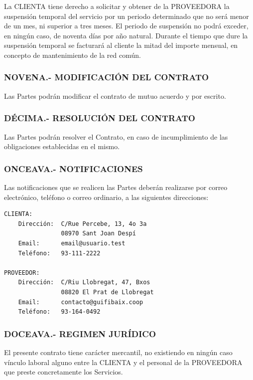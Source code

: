 \documentclass[11pt,spanish,a4paper,]{article}
\begin{document}
La CLIENTA tiene derecho a solicitar y obtener de la PROVEEDORA la
suspensión temporal del servicio por un periodo determinado que no será
menor de un mes, ni superior a tres meses. El periodo de suspensión no
podrá exceder, en ningún caso, de noventa días por año natural. Durante
el tiempo que dure la suspensión temporal se facturará al cliente la
mitad del importe mensual, en concepto de mantenimiento de la red común.

\subsubsection{NOVENA.- MODIFICACIÓN DEL
CONTRATO}\label{novena.--modificaciuxf3n-del-contrato}

Las Partes podrán modificar el contrato de mutuo acuerdo y por escrito.

\subsubsection{DÉCIMA.- RESOLUCIÓN DEL
CONTRATO}\label{duxe9cima.--resoluciuxf3n-del-contrato}

Las Partes podrán resolver el Contrato, en caso de incumplimiento de las
obligaciones establecidas en el mismo.

\subsubsection{ONCEAVA.- NOTIFICACIONES}\label{onceava.--notificaciones}

Las notificaciones que se realicen las Partes deberán realizarse por
correo electrónico, teléfono o correo ordinario, a las siguientes
direcciones:

\begin{verbatim}
CLIENTA:
    Dirección:  C/Rue Percebe, 13, 4o 3a
                08970 Sant Joan Despí
    Email:      email@usuario.test
    Teléfono:   93-111-2222

PROVEEDOR:
    Dirección:  C/Riu Llobregat, 47, Bxos
                08820 El Prat de Llobregat
    Email:      contacto@guifibaix.coop
    Teléfono:   93-164-0492
\end{verbatim}

\subsubsection{DOCEAVA.- REGIMEN
JURÍDICO}\label{doceava.--regimen-juruxeddico}

El presente contrato tiene carácter mercantil, no existiendo en ningún
caso vínculo laboral alguno entre la CLIENTA y el personal de la
PROVEEDORA que preste concretamente los Servicios.
\end{document}
